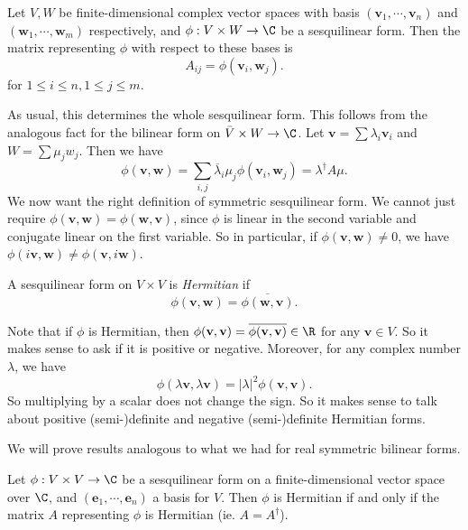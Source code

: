 \documentclass[a4paper]{article}
\begin{document}
\begin{defi}
  Let $V, W$ be finite-dimensional complex vector spaces with basis $(\mathbf{v}_1, \cdots, \mathbf{v}_n)$ and $(\mathbf{w}_1, \cdots, \mathbf{w}_m)$ respectively, and $\phi: V \times W \to \C$ be a sesquilinear form. Then the matrix representing $\phi$ with respect to these bases is
  \[
    A_{ij} = \phi(\mathbf{v}_i, \mathbf{w}_j).
  \]
  for $1 \leq i \leq n, 1 \leq j \leq m$.
\end{defi}
As usual, this determines the whole sesquilinear form. This follows from the analogous fact for the bilinear form on $\bar{V} \times W \to \C$. Let $\mathbf{v} = \sum \lambda_i \mathbf{v}_i$ and $W = \sum \mu_j w_j$. Then we have
\[
  \phi(\mathbf{v}, \mathbf{w}) = \sum_{i, j} \overline{\lambda}_i \mu_j \phi(\mathbf{v}_i, \mathbf{w}_j) = \lambda^\dagger A \mu.
\]
We now want the right definition of symmetric sesquilinear form. We cannot just require $\phi(\mathbf{v}, \mathbf{w}) = \phi(\mathbf{w}, \mathbf{v})$, since $\phi$ is linear in the second variable and conjugate linear on the first variable. So in particular, if $\phi(\mathbf{v}, \mathbf{w}) \not= 0$, we have $\phi(i \mathbf{v}, \mathbf{w}) \not= \phi(\mathbf{v}, i\mathbf{w})$.

\begin{defi}
  A sesquilinear form on $V\times V$ is \emph{Hermitian} if
  \[
    \phi(\mathbf{v}, \mathbf{w}) = \overline{\phi(\mathbf{w}, \mathbf{v})}.
  \]
\end{defi}
Note that if $\phi$ is Hermitian, then $\phi(\mathbf{v}, \mathbf{v}) = \overline{\phi(\mathbf{v}, \mathbf{v})} \in \R$ for any $\mathbf{v} \in V$. So it makes sense to ask if it is positive or negative. Moreover, for any complex number $\lambda$, we have
\[
  \phi(\lambda \mathbf{v}, \lambda \mathbf{v}) = |\lambda|^2 \phi(\mathbf{v}, \mathbf{v}).
\]
So multiplying by a scalar does not change the sign. So it makes sense to talk about positive (semi-)definite and negative (semi-)definite Hermitian forms.

We will prove results analogous to what we had for real symmetric bilinear forms.
\begin{lemma}
  Let $\phi: V \times V\to \C$ be a sesquilinear form on a finite-dimensional vector space over $\C$, and $(\mathbf{e}_1, \cdots, \mathbf{e}_n)$ a basis for $V$. Then $\phi$ is Hermitian if and only if the matrix $A$ representing $\phi$ is Hermitian (ie. $A = A^\dagger$).
\end{lemma}
\end{document}
